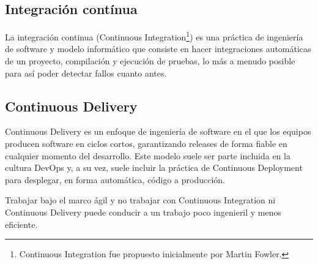 \subsection{Integración contínua}

La integración continua (Continuous Integration\footnote{Continuous Integration fue propuesto inicialmente por Martin Fowler.}) es una práctica de ingeniería de software y modelo informático que consiste en hacer integraciones automáticas de un proyecto, compilación y ejecución de pruebas, lo más a menudo posible para así poder detectar fallos cuanto antes.

\subsection{Continuous Delivery}

Continuous Delivery es un enfoque de ingeniería de software en el que los equipos producen software en ciclos cortos, garantizando releases de forma fiable en cualquier momento del desarrollo. Este modelo suele ser parte incluida en la cultura DevOps y, a su vez, suele incluir la práctica de Continuous Deployment para desplegar, en forma automática, código a producción.

Trabajar bajo el marco ágil y no trabajar con Continuous Integration ni Continuous Delivery puede conducir a un trabajo poco ingenieril y menos eficiente.
